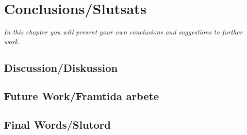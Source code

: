 \chapter{Conclusions/Slutsats}\label{Chapter5}

\emph{In this chapter you will present your own conclusions and suggestions to further work.}

\lipsum[50]

\section{Discussion/Diskussion}

\lipsum[51]

\section{Future Work/Framtida arbete}

\lipsum[52]

\section{Final Words/Slutord}

\lipsum[53]